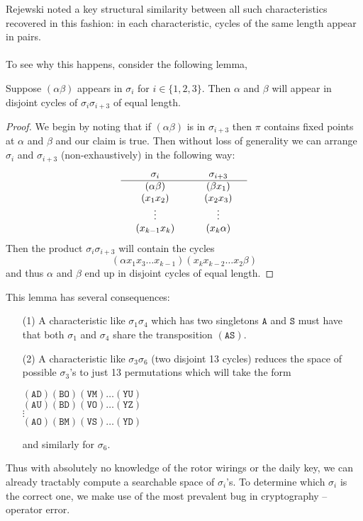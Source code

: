 Rejewski noted a key structural similarity between all such
characteristics recovered in this fashion: in each characteristic,
cycles of the same length appear in pairs.
\\\\To see why this happens, consider the following lemma,
\begin{lemma}
  \label{cillies}
  Suppose $(\alpha\beta)$ appears in $\sigma_i$ for $i\in\{1,2,3\}$.
  Then $\alpha$ and $\beta$ will appear in disjoint cycles of
  $\sigma_i\sigma_{i+3}$ of equal length.
\end{lemma}
\begin{proof}
  We begin by noting that if $(\alpha\beta)$ is in $\sigma_{i+3}$
  then $\pi$ contains fixed points at $\alpha$ and $\beta$ and our
  claim is true. Then without loss of generality we can arrange
  $\sigma_{i}$ and $\sigma_{i+3}$ (non-exhaustively) in the following way:
  \[
    \setlength{\arraycolsep}{15pt}
    \begin{array}{cc}
      \sigma_i      & \sigma_{i+3} \\
      \hline
      (\alpha\beta) & (\beta x_1)  \\
      (x_1 x_2)     & (x_2 x_3)    \\
      \vdots        & \vdots       \\
      (x_{k-1} x_k) & (x_k \alpha)
    \end{array}
  \]
  Then the product $\sigma_i\sigma_{i+3}$ will contain the cycles
  \[
    (\alpha x_1 x_3 \dots x_{k-1} )(x_k
    x_{k-2} \dots x_2 \beta)
  \]
  and thus $\alpha$ and $\beta$ end up in disjoint cycles of equal length.
\end{proof}

\noindent This lemma has several consequences:
\begin{itemize}
  \item[(1)] A characteristic like $\sigma_1\sigma_4$ which has two
    singletons $\texttt{A}$ and $\texttt{S}$ must have that both $\sigma_1$ and
    $\sigma_4$ share the transposition $(\texttt{AS})$.
  \item[(2)] A characteristic like $\sigma_3\sigma_6$ (two disjoint 13
    cycles) reduces the space of possible $\sigma_3$'s to just 13
    permutations which will take the form
    \begin{center}
      $(\texttt{AD})(\texttt{BO})(\texttt{VM})\dots(\texttt{YU})$ \\
      $(\texttt{AU})(\texttt{BD})(\texttt{VO})\dots(\texttt{YZ})$ \\
      $\vdots$                                       \\
      $(\texttt{AO})(\texttt{BM})(\texttt{VS})\dots(\texttt{YD})$
    \end{center}
    and similarly for $\sigma_6$.
\end{itemize}
Thus with absolutely no knowledge of the rotor wirings or the daily
key, we can already tractably compute a searchable space of
$\sigma_i$'s. To determine which $\sigma_i$ is the correct one, we
make use of the most prevalent bug in cryptography -- operator error.

